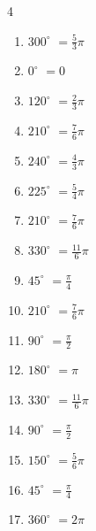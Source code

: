 \begin{multicols}{4}
\begin{enumerate}
  \item $\displaystyle 300^{\circ}$
        $\displaystyle =\frac{5}{3}\pi$

  \item $\displaystyle 0^{\circ}$
        $\displaystyle =0$

  \item $\displaystyle 120^{\circ}$
        $\displaystyle =\frac{2}{3}\pi$

  \item $\displaystyle 210^{\circ}$
        $\displaystyle =\frac{7}{6}\pi$

  \item $\displaystyle 240^{\circ}$
        $\displaystyle =\frac{4}{3}\pi$

  \item $\displaystyle 225^{\circ}$
        $\displaystyle =\frac{5}{4}\pi$

  \item $\displaystyle 210^{\circ}$
        $\displaystyle =\frac{7}{6}\pi$

  \item $\displaystyle 330^{\circ}$
        $\displaystyle =\frac{11}{6}\pi$

  \item $\displaystyle 45^{\circ}$
        $\displaystyle =\frac{\pi}{4}$

  \item $\displaystyle 210^{\circ}$
        $\displaystyle =\frac{7}{6}\pi$

  \item $\displaystyle 90^{\circ}$
        $\displaystyle =\frac{\pi}{2}$

  \item $\displaystyle 180^{\circ}$
        $\displaystyle =\pi$

  \item $\displaystyle 330^{\circ}$
        $\displaystyle =\frac{11}{6}\pi$

\columnbreak %

  \item $\displaystyle 90^{\circ}$
        $\displaystyle =\frac{\pi}{2}$

  \item $\displaystyle 150^{\circ}$
        $\displaystyle =\frac{5}{6}\pi$

  \item $\displaystyle 45^{\circ}$
        $\displaystyle =\frac{\pi}{4}$

  \item $\displaystyle 360^{\circ}$
        $\displaystyle =2\pi$


\end{enumerate}
\end{multicols}
